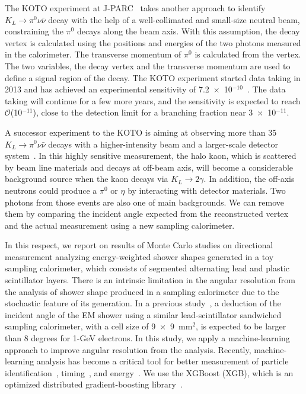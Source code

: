 \documentclass[12pt,times,draftclsnofoot,a4paper]{elsarticle}
\begin{document}
The KOTO experiment at J-PARC~\cite{KOTOexp} takes another approach to identify $K_{L} \rightarrow \pi^{0}\nu\bar{\nu}$ decay with the help of a well-collimated and small-size neutral beam, constraining the $\pi^{0}$ decays along the beam axis. With this assumption, the decay vertex is calculated using the positions and energies of the two photons measured in the calorimeter. The transverse momentum of $\pi^{0}$ is calculated from the vertex. The two variables, the decay vertex and the transverse momentum are used to define a signal region of the decay. The KOTO experiment started data taking in 2013 and has achieved an experimental sensitivity of 7.2~$\times$~10$^{-10}$~\cite{KOTOexp}. The data taking will continue for a few more years, and the sensitivity is expected to reach $\mathcal{O}$(10$^{-11}$), close to the detection limit for a branching fraction near 3~$\times$~10$^{-11}$.

A successor experiment to the KOTO is aiming at observing more than 35 $K_{L} \rightarrow \pi^{0}\nu\bar{\nu}$ decays with a higher-intensity beam and a larger-scale detector system~\cite{KOTO2}. In this highly sensitive measurement, the halo kaon, which is scattered by beam line materials and decays at off-beam axis, will become a considerable background source when the kaon decays via $K_{L} \rightarrow 2\gamma$. In addition, the off-axis neutrons could produce a $\pi^{0}$ or $\eta$ by interacting with detector materials. Two photons from those events are also one of main backgrounds. We can remove them by comparing the incident angle expected from the reconstructed vertex and the actual measurement using a new sampling calorimeter.

In this respect, we report on results of Monte Carlo studies on directional measurement analyzing energy-weighted shower shapes generated in a toy sampling calorimeter, which consists of segmented alternating lead and plastic scintillator layers. There is an intrinsic limitation in the angular resolution from the analysis of shower shape produced in a sampling calorimeter due to the stochastic feature of its generation. In a previous study~\cite{PbScint}, a deduction of the incident angle of the EM shower using a similar lead-scintillator sandwiched sampling calorimeter, with a cell size of 9~$\times$~9~mm$^{2}$, is expected to be larger than 8 degrees for 1-GeV electrons. In this study, we apply a machine-learning approach to improve angular resolution from the analysis. Recently, machine-learning analysis has become a critical tool for better measurement of particle identification~\cite{mlp}, timing~\cite{mlt}, and energy~\cite{mle}. We use the XGBoost (XGB), which is an optimized distributed gradient-boosting library~\cite{xgboost:2016}.
\end{document}
